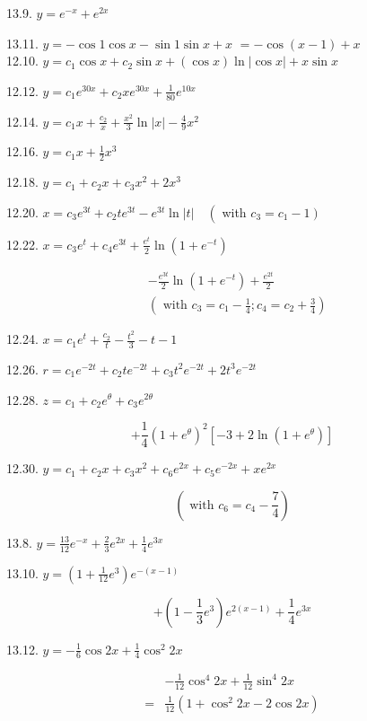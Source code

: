 \documentclass[10pt]{article}
\begin{document}
13.9. $y=e^{-x}+e^{2 x}$

13.11. $y=-\cos 1 \cos x-\sin 1 \sin x+x$ $=-\cos (x-1)+x$\\
12.10. $y=c_{1} \cos x+c_{2} \sin x+(\cos x) \ln |\cos x|+x \sin x$

12.12. $y=c_{1} e^{30 x}+c_{2} x e^{30 x}+\frac{1}{80} e^{10 x}$

12.14. $y=c_{1} x+\frac{c_{2}}{x}+\frac{x^{2}}{3} \ln |x|-\frac{4}{9} x^{2}$

12.16. $y=c_{1} x+\frac{1}{2} x^{3}$

12.18. $y=c_{1}+c_{2} x+c_{3} x^{2}+2 x^{3}$

12.20. $x=c_{3} e^{3 t}+c_{2} t e^{3 t}-e^{3 t} \ln |t| \quad\left(\right.$ with $\left.c_{3}=c_{1}-1\right)$

12.22. $x=c_{3} e^{t}+c_{4} e^{3 t}+\frac{e^{t}}{2} \ln \left(1+e^{-t}\right)$

$$
\begin{aligned}
& -\frac{e^{3 t}}{2} \ln \left(1+e^{-t}\right)+\frac{e^{2 t}}{2} \\
& \left(\text { with } c_{3}=c_{1}-\frac{1}{4} ; c_{4}=c_{2}+\frac{3}{4}\right)
\end{aligned}
$$

12.24. $x=c_{1} e^{t}+\frac{c_{2}}{t}-\frac{t^{2}}{3}-t-1$

12.26. $r=c_{1} e^{-2 t}+c_{2} t e^{-2 t}+c_{3} t^{2} e^{-2 t}+2 t^{3} e^{-2 t}$

12.28. $z=c_{1}+c_{2} e^{\theta}+c_{3} e^{2 \theta}$

$$
+\frac{1}{4}\left(1+e^{\theta}\right)^{2}\left[-3+2 \ln \left(1+e^{\theta}\right)\right]
$$

12.30. $y=c_{1}+c_{2} x+c_{3} x^{2}+c_{6} e^{2 x}+c_{5} e^{-2 x}+x e^{2 x}$

$$
\left(\text { with } c_{6}=c_{4}-\frac{7}{4}\right)
$$

13.8. $y=\frac{13}{12} e^{-x}+\frac{2}{3} e^{2 x}+\frac{1}{4} e^{3 x}$

13.10. $y=\left(1+\frac{1}{12} e^{3}\right) e^{-(x-1)}$

$$
+\left(1-\frac{1}{3} e^{3}\right) e^{2(x-1)}+\frac{1}{4} e^{3 x}
$$

13.12. $y=-\frac{1}{6} \cos 2 x+\frac{1}{4} \cos ^{2} 2 x$

$$
\begin{aligned}
& -\frac{1}{12} \cos ^{4} 2 x+\frac{1}{12} \sin ^{4} 2 x \\
= & \frac{1}{12}\left(1+\cos ^{2} 2 x-2 \cos 2 x\right)
\end{aligned}
$$
\end{document}
